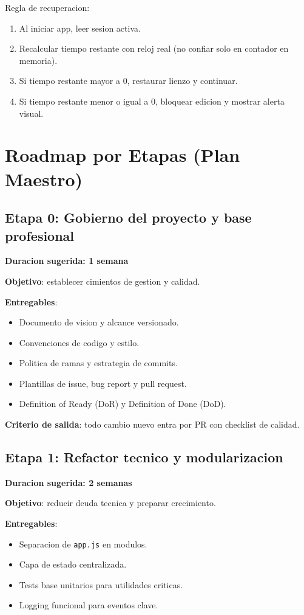\documentclass[12pt,a4paper]{article}
\begin{document}
Regla de recuperacion:
\begin{enumerate}
  \item Al iniciar app, leer sesion activa.
  \item Recalcular tiempo restante con reloj real (no confiar solo en contador en memoria).
  \item Si tiempo restante mayor a 0, restaurar lienzo y continuar.
  \item Si tiempo restante menor o igual a 0, bloquear edicion y mostrar alerta visual.
\end{enumerate}

\section{Roadmap por Etapas (Plan Maestro)}
\subsection{Etapa 0: Gobierno del proyecto y base profesional}
\textbf{Duracion sugerida: 1 semana}

\textbf{Objetivo}: establecer cimientos de gestion y calidad.

\textbf{Entregables}:
\begin{itemize}
  \item Documento de vision y alcance versionado.
  \item Convenciones de codigo y estilo.
  \item Politica de ramas y estrategia de commits.
  \item Plantillas de issue, bug report y pull request.
  \item Definition of Ready (DoR) y Definition of Done (DoD).
\end{itemize}

\textbf{Criterio de salida}: todo cambio nuevo entra por PR con checklist de calidad.

\subsection{Etapa 1: Refactor tecnico y modularizacion}
\textbf{Duracion sugerida: 2 semanas}

\textbf{Objetivo}: reducir deuda tecnica y preparar crecimiento.

\textbf{Entregables}:
\begin{itemize}
  \item Separacion de \texttt{app.js} en modulos.
  \item Capa de estado centralizada.
  \item Tests base unitarios para utilidades criticas.
  \item Logging funcional para eventos clave.
\end{itemize}
\end{document}
